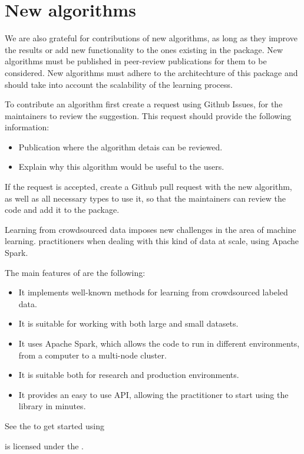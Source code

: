 \documentclass[letterpaper,10pt,english]{sphinxmanual}
\begin{document}
\section{New algorithms}
\label{\detokenize{package/contributors:new-algorithms}}
We are also grateful for contributions of new algorithms, as long as they improve the results or add new functionality to the ones existing in the package.
New algorithms must be published in peer-review publications for them to be considered. New algorithms must adhere to the architechture of this package and
should take into account the scalability of the learning process.

To contribute an algorithm first create a request using Github Issues, for the maintainers to review the suggestion. This request should provide the following information:
\begin{itemize}
\item {} 
Publication where the algorithm detais can be reviewed.

\item {} 
Explain why this algorithm would be useful to the users.

\end{itemize}

If the request is accepted, create a Github pull request with the new algorithm, as well as all necessary types to use it, so that the maintainers can review the
code and add it to the package.

Learning from crowdsourced data imposes new challenges
in the area of machine learning.  practitioners
when dealing with this kind of data at scale, using Apache Spark.

\noindent{}

The main features of  are the following:
\begin{itemize}
\item {} 
It implements well-known methods for learning from crowdsourced labeled data.

\item {} 
It is suitable for working with both large and small datasets.

\item {} 
It uses Apache Spark, which allows the code to run in different environments, from a computer to a multi-node cluster.

\item {} 
It is suitable both for research and production environments.

\item {} 
It provides an easy to use API, allowing the practitioner to start using the library in minutes.

\end{itemize}

See the {\hyperref[\detokenize{usage/quickstart:quickstart}]{}} to get started using 

 is licensed under the .



\renewcommand{\indexname}{Index}
\printindex
\end{document}
